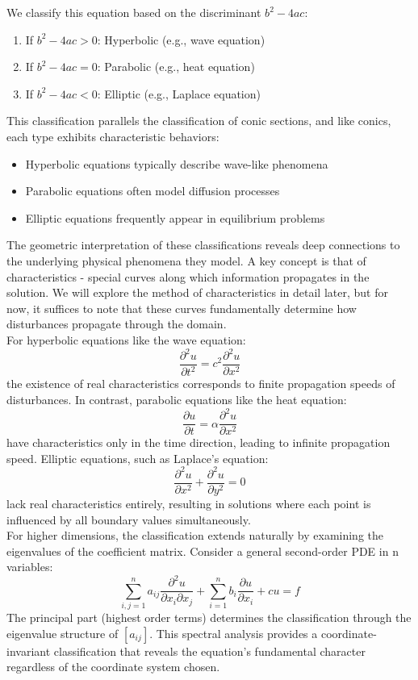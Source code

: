 \noindent We classify this equation based on the discriminant $b^2 - 4ac$:
\begin{enumerate}
\item If $b^2 - 4ac > 0$: Hyperbolic (e.g., wave equation)
\item If $b^2 - 4ac = 0$: Parabolic (e.g., heat equation)
\item If $b^2 - 4ac < 0$: Elliptic (e.g., Laplace equation)
\end{enumerate}

\noindent This classification parallels the classification of conic sections, and like conics, each type exhibits characteristic behaviors:
\begin{itemize}
\item Hyperbolic equations typically describe wave-like phenomena
\item Parabolic equations often model diffusion processes
\item Elliptic equations frequently appear in equilibrium problems
\end{itemize}

\noindent The geometric interpretation of these classifications reveals deep connections to the underlying physical phenomena they model. A key concept is that of characteristics - special curves along which information propagates in the solution. We will explore the method of characteristics in detail later, but for now, it suffices to note that these curves fundamentally determine how disturbances propagate through the domain. \\

\noindent For hyperbolic equations like the wave equation:
\[
\frac{\partial^2 u}{\partial t^2} = c^2\frac{\partial^2 u}{\partial x^2}
\]
the existence of real characteristics corresponds to finite propagation speeds of disturbances. In contrast, parabolic equations like the heat equation:
\[
\frac{\partial u}{\partial t} = \alpha\frac{\partial^2 u}{\partial x^2}
\]
have characteristics only in the time direction, leading to infinite propagation speed. Elliptic equations, such as Laplace's equation:
\[
\frac{\partial^2 u}{\partial x^2} + \frac{\partial^2 u}{\partial y^2} = 0
\]
lack real characteristics entirely, resulting in solutions where each point is influenced by all boundary values simultaneously. \\

\noindent For higher dimensions, the classification extends naturally by examining the eigenvalues of the coefficient matrix. Consider a general second-order PDE in n variables:
\[
\sum_{i,j=1}^n a_{ij}\frac{\partial^2 u}{\partial x_i\partial x_j} + \sum_{i=1}^n b_i\frac{\partial u}{\partial x_i} + cu = f
\]
The principal part (highest order terms) determines the classification through the eigenvalue structure of $[a_{ij}]$. This spectral analysis provides a coordinate-invariant classification that reveals the equation's fundamental character regardless of the coordinate system chosen. \\

